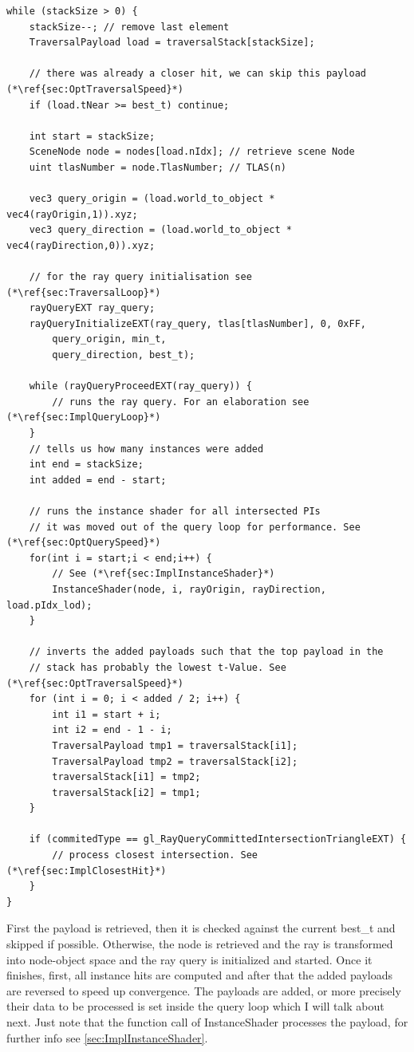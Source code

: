 \begin{lstlisting}
while (stackSize > 0) {
	stackSize--; // remove last element
	TraversalPayload load = traversalStack[stackSize];
	
	// there was already a closer hit, we can skip this payload (*\ref{sec:OptTraversalSpeed}*)
	if (load.tNear >= best_t) continue;
	
	int start = stackSize;
	SceneNode node = nodes[load.nIdx]; // retrieve scene Node
	uint tlasNumber = node.TlasNumber; // TLAS(n)
	
	vec3 query_origin = (load.world_to_object * vec4(rayOrigin,1)).xyz;
	vec3 query_direction = (load.world_to_object * vec4(rayDirection,0)).xyz;
	
	// for the ray query initialisation see (*\ref{sec:TraversalLoop}*)
	rayQueryEXT ray_query;
	rayQueryInitializeEXT(ray_query, tlas[tlasNumber], 0, 0xFF,
		query_origin, min_t,
		query_direction, best_t);

	while (rayQueryProceedEXT(ray_query)) {
	    // runs the ray query. For an elaboration see (*\ref{sec:ImplQueryLoop}*)
	}
	// tells us how many instances were added
	int end = stackSize;
	int added = end - start;
	
	// runs the instance shader for all intersected PIs
	// it was moved out of the query loop for performance. See (*\ref{sec:OptQuerySpeed}*)
	for(int i = start;i < end;i++) {
		// See (*\ref{sec:ImplInstanceShader}*)
		InstanceShader(node, i, rayOrigin, rayDirection, load.pIdx_lod);
	}
	
	// inverts the added payloads such that the top payload in the 
	// stack has probably the lowest t-Value. See (*\ref{sec:OptTraversalSpeed}*)
	for (int i = 0; i < added / 2; i++) {
		int i1 = start + i;
		int i2 = end - 1 - i;
		TraversalPayload tmp1 = traversalStack[i1];
		TraversalPayload tmp2 = traversalStack[i2];
		traversalStack[i1] = tmp2;
		traversalStack[i2] = tmp1;
	}
	
	if (commitedType == gl_RayQueryCommittedIntersectionTriangleEXT) {
		// process closest intersection. See (*\ref{sec:ImplClosestHit}*)
	}
}
\end{lstlisting}

First the payload is retrieved, then it is checked against the current best\_t and skipped if possible. Otherwise, the node is retrieved and the ray is transformed into node-object space and the ray query is initialized and started. Once it finishes, first, all instance hits are computed and after that the added payloads are reversed to speed up convergence. The payloads are added, or more precisely their data to be processed is set inside the query loop which I will talk about next. Just note that the function call of InstanceShader processes the payload, for further info see \ref{sec:ImplInstanceShader}.
\newpage
